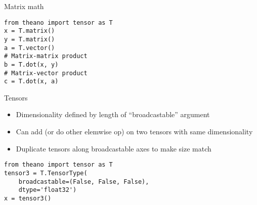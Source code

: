 \documentclass[utf8x,hyperref={pdfpagelabels=false}]{beamer}
\begin{document}
\begin{frame}[fragile]{Matrix math}
\begin{lstlisting}
from theano import tensor as T
x = T.matrix()
y = T.matrix()
a = T.vector()
# Matrix-matrix product
b = T.dot(x, y)
# Matrix-vector product
c = T.dot(x, a)
\end{lstlisting}
\end{frame}

\begin{frame}[fragile]{Tensors}
   \begin{itemize}
    \item Dimensionality defined by length of ``broadcastable'' argument
    \item Can add (or do other elemwise op) on two
      tensors with same dimensionality
    \item Duplicate tensors along broadcastable axes to
      make size match
  \end{itemize}
\begin{lstlisting}
from theano import tensor as T
tensor3 = T.TensorType(
    broadcastable=(False, False, False),
    dtype='float32')
x = tensor3()
\end{lstlisting}
\end{frame}
\end{document}

